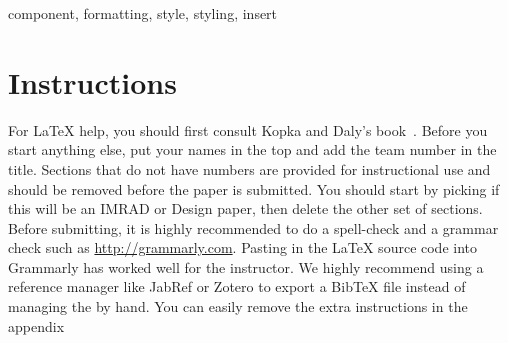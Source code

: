 \documentclass[conference,a4paper]{IEEEtran}
\begin{document}
\maketitle
\begin{abstract}
  Beal recommends that you consolidate the whole paper into 5 sentences in 250 words or preferably less:
  \begin{enumerate}
  \item There is a problem with these real effects or this situation.
  \item Here is a general approach to fixing it.
  \item We now present this particular step.
  \item In particular, we did these very specific things.
  \item Success is confirmed by this quantitative result.
  \end{enumerate}

  Remember that an abstract often gets separated from the report:
  {\em do Not Use Symbols, Special Characters, Footnotes, or Math in Paper Title or Abstract!\/}

\end{abstract}

\begin{IEEEkeywords}
component, formatting, style, styling, insert
\end{IEEEkeywords}

\section*{Instructions}
For LaTeX help, you should first consult Kopka and Daly's book~\cite{kopka1999guidetolatex}.
Before you start anything else, put your names in the top and add the team number in the title.
Sections that do not have numbers are provided for instructional use and should be removed before the paper is submitted.
You should start by picking if this will be an IMRAD or Design paper, then delete the other set of sections.
Before submitting, it is highly recommended to do a spell-check and a grammar check such as \url{http://grammarly.com}.
Pasting in the \LaTeX{} source code into Grammarly has worked well for the instructor.
We highly recommend using a reference manager like JabRef or Zotero to export a BibTeX file instead of managing the  by hand.
You can easily remove the extra instructions in the appendix 
\end{document}
